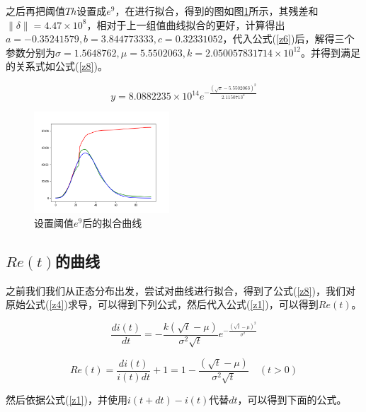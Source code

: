 \documentclass{article}
\begin{document}
\begin{multicols}{2}
                之后再把阈值$Th$设置成$e^{9}$，在进行拟合，得到的图如图\ref{plot6}所示，其残差和$\parallel\delta\parallel=4.47{\times}10^8$，相对于上一组值曲线拟合的更好，计算得出$a=-0.35241579,b=3.844773333,c=0.32331052$，代入公式(\ref{z6})后，解得三个参数分别为$\sigma=1.5648762,\mu=5.5502063,k=2.050057831714{\times}10^{12}$。并得到满足的关系式如公式(\ref{z8})。

                \begin{equation}
                    y=8.0882235{\times}10^{14}e^{-\frac{(\sqrt{x}-5.5502063)^2}{2.1150713^2}}
                    \label{z8}
                \end{equation}

                \begin{figure}[H]
                    \centering
                    \includegraphics[width=0.45\textwidth]{plot6}
                    \caption{设置阈值$e^9$后的拟合曲线}
                    \label{plot6}
                \end{figure}
            \subsection{$Re(t)$的曲线}
                之前我们我们从正态分布出发，尝试对曲线进行拟合，得到了公式(\ref{z8})，我们对原始公式(\ref{z4})求导，可以得到下列公式，然后代入公式(\ref{z1})，可以得到$Re(t)$。

                \begin{equation}
                    \frac{di(t)}{dt}=-\frac{k(\sqrt{t}-\mu)}{\sigma^2\sqrt{t}}e^{-\frac{(\sqrt{t}-\mu)^2}{\sigma^2}}
                \end{equation}

                \begin{equation}
                    Re(t)=\frac{di(t)}{i(t)dt}+1=1-\frac{(\sqrt{t}-\mu)}{\sigma^2\sqrt{t}}{\quad}(t>0)
                    \label{z10}
                \end{equation}
                
                然后依据公式(\ref{z1})，并使用$i(t+dt)-i(t)$代替$dt$，可以得到下面的公式。


\end{multicols}
\end{document}
